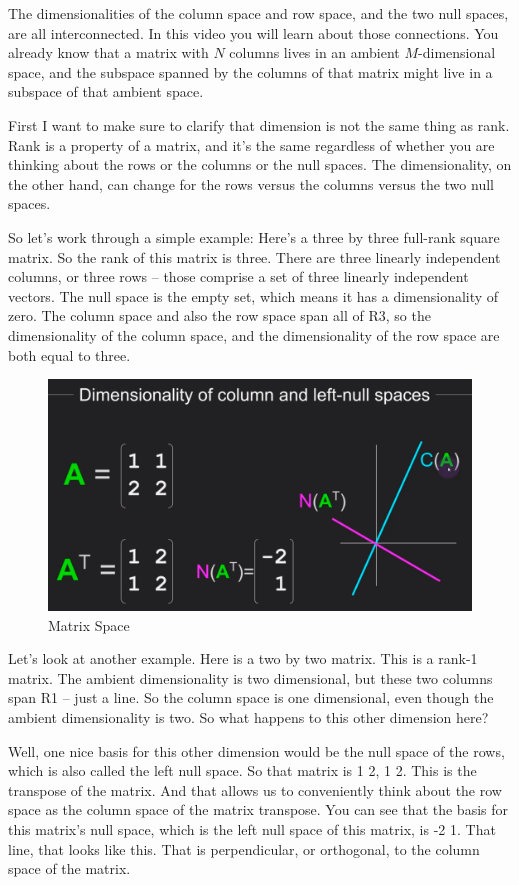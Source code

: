 \documentclass[fleqn,10pt]{olplainarticle}
\theoremstyle{definition}
\theoremstyle{remark}
\begin{document}
The dimensionalities of the column space and row space, and the two null spaces, are all interconnected. In this video you will learn about those connections. You already know that a matrix with $N$ columns lives in an ambient $M$-dimensional space, and the subspace spanned by the columns of that matrix might live in a subspace of that ambient space.

First I want to make sure to clarify that dimension is not the same thing as rank. Rank is a property of a matrix, and it's the same regardless of whether you are thinking about the rows or the columns or the null spaces. The dimensionality, on the other hand, can change for the rows versus the columns versus the two null spaces.

So let's work through a simple example: Here's a three by three full-rank square matrix. So the rank of this matrix is three. There are three linearly independent columns, or three rows -- those comprise a set of three linearly independent vectors. The null space is the empty set, which means it has a dimensionality of zero. The column space and also the row space span all of R3, so the dimensionality of the column space, and the dimensionality of the row space are both equal to three.

\begin{figure}[ht]
	\centering
	\includegraphics[width=0.6\linewidth]{images/matrix-space-32.png}
	\caption{Matrix Space}
	\label{fig:matrix_space_32}
\end{figure}

Let's look at another example. Here is a two by two matrix. This is a rank-1 matrix. The ambient dimensionality is two dimensional, but these two columns span R1 -- just a line. So the column space is one dimensional, even though the ambient dimensionality is two. So what happens to this other dimension here?

Well, one nice basis for this other dimension would be the null space of the rows, which is also called the left null space. So that matrix is 1 2, 1 2. This is the transpose of the matrix. And that allows us to conveniently think about the row space as the column space of the matrix transpose. You can see that the basis for this matrix's null space, which is the left null space of this matrix, is -2 1. That line, that looks like this. That is perpendicular, or orthogonal, to the column space of the matrix.
\end{document}
